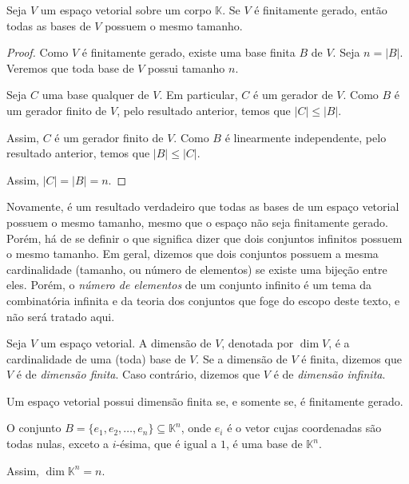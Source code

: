 \begin{corollary}
    Seja $V$ um espaço vetorial sobre um corpo $\mathbb K$.
    Se $V$ é finitamente gerado, então todas as bases de $V$ possuem o mesmo tamanho.
\end{corollary}
\begin{proof}
    Como $V$ é finitamente gerado, existe uma base finita $B$ de $V$.
    Seja $n=|B|$.
    Veremos que toda base de $V$ possui tamanho $n$.

    Seja $C$ uma base qualquer de $V$.
    Em particular, $C$ é um gerador de $V$. Como $B$ é um gerador finito de $V$, pelo resultado anterior, temos que $|C| \leq |B|$.

    Assim, $C$ é um gerador finito de $V$.
    Como $B$ é linearmente independente, pelo resultado anterior, temos que $|B| \leq |C|$.

    Assim, $|C|=|B|=n$.
\end{proof}

Novamente, é um resultado verdadeiro que todas as bases de um espaço vetorial possuem o mesmo tamanho, mesmo que o espaço não seja finitamente gerado.
Porém, há de se definir o que significa dizer que dois conjuntos infinitos possuem o mesmo tamanho.
Em geral, dizemos que dois conjuntos possuem a mesma cardinalidade (tamanho, ou número de elementos) se existe uma bijeção entre eles.
Porém, o \emph{número de elementos} de um conjunto infinito é um tema da combinatória infinita e da teoria dos conjuntos que foge do escopo deste texto, e não será tratado aqui.

\begin{definition}
    Seja $V$ um espaço vetorial.
    A dimensão de $V$, denotada por $\dim V$, é a cardinalidade de uma (toda) base de $V$.
    Se a dimensão de $V$ é finita, dizemos que $V$ é de \emph{dimensão finita}.
    Caso contrário, dizemos que $V$ é de \emph{dimensão infinita}.
\end{definition}

\begin{corollary}
    Um espaço vetorial possui dimensão finita se, e somente se, é finitamente gerado.
\end{corollary}
\begin{example}
    O conjunto $B=\{e_1, e_2, \ldots, e_n\} \subseteq \mathbb K^n$, onde $e_i$ é o vetor cujas coordenadas são todas nulas, exceto a $i$-ésima, que é igual a $1$, é uma base de $\mathbb K^n$.

    Assim, $\dim \mathbb K^n = n$.
\end{example}

